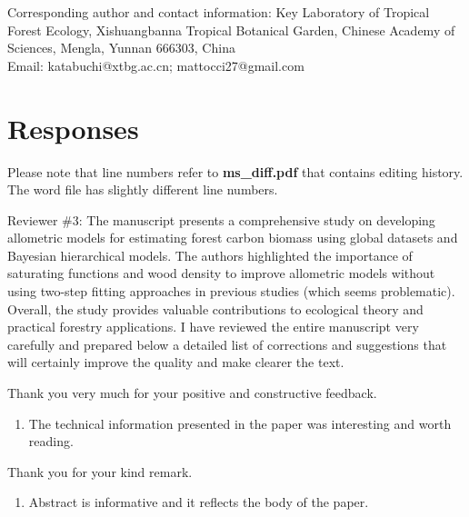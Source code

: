 \documentclass[
  12pt,
  letterpaper,
  DIV=11,
  numbers=noendperiod]{scrartcl}
\providecommand{\tightlist}{%
  \setlength{\itemsep}{0pt}\setlength{\parskip}{0pt}}\usepackage{longtable,booktabs,array}
\renewenvironment{quote}
  {\begin{customblockquote}\color{blockquote-text}\ignorespaces}
  {\end{customblockquote}}
\begin{document}
Corresponding author and contact information: Key Laboratory of Tropical
Forest Ecology, Xishuangbanna Tropical Botanical Garden, Chinese Academy
of Sciences, Mengla, Yunnan 666303, China\\
Email: katabuchi@xtbg.ac.cn; mattocci27@gmail.com

\newpage

\section{Responses}\label{responses}

Please note that line numbers refer to \textbf{ms\_diff.pdf} that
contains editing history. The word file has slightly different line
numbers.

\begin{quote}
Reviewer \#3: The manuscript presents a comprehensive study on
developing allometric models for estimating forest carbon biomass using
global datasets and Bayesian hierarchical models. The authors
highlighted the importance of saturating functions and wood density to
improve allometric models without using two-step fitting approaches in
previous studies (which seems problematic). Overall, the study provides
valuable contributions to ecological theory and practical forestry
applications. I have reviewed the entire manuscript very carefully and
prepared below a detailed list of corrections and suggestions that will
certainly improve the quality and make clearer the text.
\end{quote}

Thank you very much for your positive and constructive feedback.

\begin{quote}
\begin{enumerate}
\def\labelenumi{\arabic{enumi})}
\tightlist
\item
  The technical information presented in the paper was interesting and
  worth reading.
\end{enumerate}
\end{quote}

Thank you for your kind remark.

\begin{quote}
\begin{enumerate}
\def\labelenumi{\arabic{enumi})}
\setcounter{enumi}{1}
\tightlist
\item
  Abstract is informative and it reflects the body of the paper.
\end{enumerate}
\end{quote}
\end{document}
